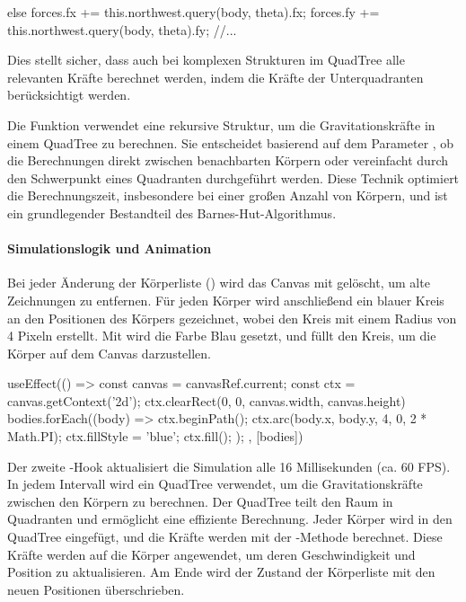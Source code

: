 \documentclass[a4paper,12pt,twoside]{article}
\begin{document}
\begin{javascript}
else {
    forces.fx += this.northwest.query(body, theta).fx;
    forces.fy += this.northwest.query(body, theta).fy;
    //...
}
\end{javascript}

Dies stellt sicher, dass auch bei komplexen Strukturen im QuadTree alle relevanten Kräfte berechnet werden, indem die Kräfte der Unterquadranten berücksichtigt werden.


Die Funktion  verwendet eine rekursive Struktur, um die Gravitationskräfte in einem QuadTree zu berechnen. Sie entscheidet basierend auf dem Parameter , ob die Berechnungen direkt zwischen benachbarten Körpern oder vereinfacht durch den Schwerpunkt eines Quadranten durchgeführt werden. Diese Technik optimiert die Berechnungszeit, insbesondere bei einer großen Anzahl von Körpern, und ist ein grundlegender Bestandteil des Barnes-Hut-Algorithmus.







\paragraph{Simulationslogik und Animation}

Bei jeder Änderung der Körperliste () wird das Canvas mit  gelöscht, um alte Zeichnungen zu entfernen. Für jeden Körper wird anschließend ein blauer Kreis an den Positionen des Körpers gezeichnet, wobei  den Kreis mit einem Radius von 4 Pixeln erstellt. Mit  wird die Farbe Blau gesetzt, und  füllt den Kreis, um die Körper auf dem Canvas darzustellen.

\begin{javascript}
	useEffect(() => {
        const canvas = canvasRef.current;
        const ctx = canvas.getContext('2d');
        ctx.clearRect(0, 0, canvas.width, canvas.height)
        bodies.forEach((body) => {
            ctx.beginPath();
            ctx.arc(body.x, body.y, 4, 0, 2 * Math.PI);
            ctx.fillStyle = 'blue';
            ctx.fill();
        });
    }, [bodies])
\end{javascript}


Der zweite -Hook aktualisiert die Simulation alle 16 Millisekunden (ca. 60 FPS). In jedem Intervall wird ein QuadTree verwendet, um die Gravitationskräfte zwischen den Körpern zu berechnen. Der QuadTree teilt den Raum in Quadranten und ermöglicht eine effiziente Berechnung. Jeder Körper wird in den QuadTree eingefügt, und die Kräfte werden mit der -Methode berechnet. Diese Kräfte werden auf die Körper angewendet, um deren Geschwindigkeit und Position zu aktualisieren. Am Ende wird der Zustand der Körperliste mit den neuen Positionen überschrieben.
\end{document}
